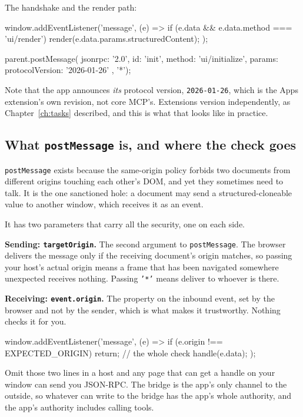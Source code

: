 The handshake and the render path:

\begin{ts}
window.addEventListener('message', (e) => {
  if (e.data && e.data.method === 'ui/render')
    render(e.data.params.structuredContent);
});

parent.postMessage({ jsonrpc: '2.0', id: 'init', method: 'ui/initialize',
                     params: { protocolVersion: '2026-01-26' } }, '*');
\end{ts}

Note that the app announces \emph{its} protocol version, \texttt{2026-01-26},
which is the Apps extension's own revision, not core MCP's. Extensions
version independently, as Chapter~\ref{ch:tasks} described, and this is what
that looks like in practice.

\subsection{What \texttt{postMessage} is, and where the check goes}

\texttt{postMessage} exists because the same-origin policy forbids two documents
from different origins touching each other's DOM, and yet they sometimes need to
talk. It is the one sanctioned hole: a document may send a structured-cloneable
value to another window, which receives it as an event.

It has two parameters that carry all the security, one on each side.

\textbf{Sending: \texttt{targetOrigin}.} The second argument to
\texttt{postMessage}. The browser delivers the message only if the receiving
document's origin matches, so passing your host's actual origin means a frame
that has been navigated somewhere unexpected receives nothing. Passing
\texttt{'*'} means deliver to whoever is there.

\textbf{Receiving: \texttt{event.origin}.} The property on the inbound event,
set by the browser and not by the sender, which is what makes it trustworthy.
Nothing checks it for you.

\begin{plain}
window.addEventListener('message', (e) => {
  if (e.origin !== EXPECTED_ORIGIN) return;   // the whole check
  handle(e.data);
});
\end{plain}

Omit those two lines in a host and any page that can get a handle on your window
can send you JSON-RPC. The bridge is the app's only channel to the outside, so
whatever can write to the bridge has the app's whole authority, and the app's
authority includes calling tools.

